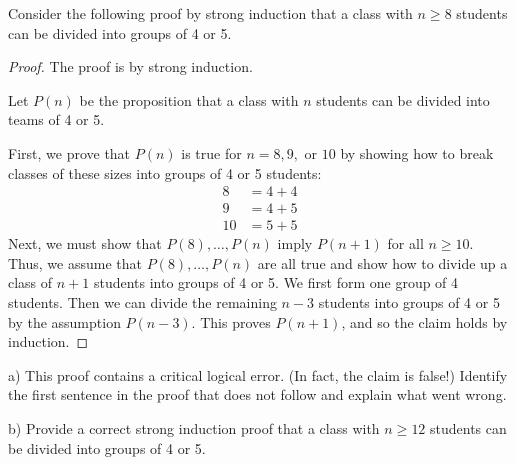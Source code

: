 \documentclass[a4paper]{exam}
\begin{document}
\begin{questions}
  \begin{solution}
  \end{solution}
  
  \question 
  Consider the following proof by strong induction that a class with \( n \geq 8 \) students can be divided into groups of 4 or 5.

  \begin{mdframed}
    \begin{proof} The proof is by strong induction.

      Let \( P(n) \) be the proposition that a class with \( n \) students can be divided into teams of 4 or 5.

      First, we prove that \( P(n) \) is true for \( n = 8, 9, \) or \( 10 \) by showing how to break classes of these sizes into groups of 4 or 5 students:
      \begin{align*}
8  &= 4 + 4 \\
9  &= 4 + 5 \\
10 &= 5 + 5 
      \end{align*}
Next, we must show that \( P(8), \ldots, P(n) \) imply \( P(n + 1) \) for all \( n \geq 10 \). Thus, we assume that \( P(8), \ldots, P(n) \) are all true and show how to divide up a class of \( n + 1 \) students into groups of 4 or 5. We first form one group of 4 students. Then we can divide the remaining \( n-3 \) students into groups of 4 or 5 by the assumption \( P(n-3) \). This proves \( P(n+1) \), and so the claim holds by induction.
\end{proof}
\end{mdframed}

a)
This proof contains a critical logical error. (In fact, the claim is false!) Identify the first sentence in the proof that does not follow and explain what went wrong.
  \begin{solution}
      
  \end{solution}
b)
Provide a correct strong induction proof that a class with \( n \geq 12 \) students can be divided into groups of 4 or 5.
  \begin{solution}
      
  \end{solution}

\end{questions}
\end{document}
